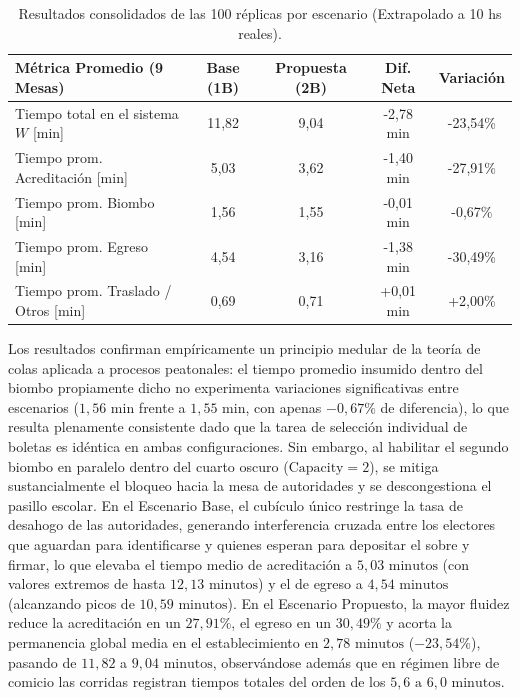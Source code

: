 \documentclass[11pt,a4paper]{article}
\begin{document}
\begin{table}[H]
    \centering
    \small
    \setlength{\tabcolsep}{5pt}
    \caption{Resultados consolidados de las 100 réplicas por escenario (Extrapolado a 10 hs reales).}
    \label{tab:metricas_corridas}
    \begin{tabularx}{\textwidth}{Xcccc}
        \toprule
        \textbf{Métrica Promedio (9 Mesas)} & \textbf{Base (1B)} & \textbf{Propuesta (2B)} & \textbf{Dif. Neta} & \textbf{Variación} \\
        \midrule
        Tiempo total en el sistema $W$ [min] & 11,82 & 9,04 & -2,78 min & -23,54\% \\
        Tiempo prom. Acreditación [min]      & 5,03  & 3,62 & -1,40 min & -27,91\% \\
        Tiempo prom. Biombo [min]            & 1,56  & 1,55 & -0,01 min & -0,67\%  \\
        Tiempo prom. Egreso [min]            & 4,54  & 3,16 & -1,38 min & -30,49\% \\
        Tiempo prom. Traslado / Otros [min]  & 0,69  & 0,71 & +0,01 min & +2,00\%  \\
        \bottomrule
    \end{tabularx}
\end{table}

Los resultados confirman empíricamente un principio medular de la teoría de colas aplicada a procesos peatonales: el tiempo promedio insumido dentro del biombo propiamente dicho no experimenta variaciones significativas entre escenarios ($1{,}56\text{ min}$ frente a $1{,}55\text{ min}$, con apenas $-0{,}67\%$ de diferencia), lo que resulta plenamente consistente dado que la tarea de selección individual de boletas es idéntica en ambas configuraciones. Sin embargo, al habilitar el segundo biombo en paralelo dentro del cuarto oscuro ($\text{Capacity} = 2$), se mitiga sustancialmente el bloqueo hacia la mesa de autoridades y se descongestiona el pasillo escolar. En el Escenario Base, el cubículo único restringe la tasa de desahogo de las autoridades, generando interferencia cruzada entre los electores que aguardan para identificarse y quienes esperan para depositar el sobre y firmar, lo que elevaba el tiempo medio de acreditación a $5{,}03\text{ minutos}$ (con valores extremos de hasta $12{,}13\text{ minutos}$) y el de egreso a $4{,}54\text{ minutos}$ (alcanzando picos de $10{,}59\text{ minutos}$). En el Escenario Propuesto, la mayor fluidez reduce la acreditación en un $27{,}91\%$, el egreso en un $30{,}49\%$ y acorta la permanencia global media en el establecimiento en $2{,}78\text{ minutos}$ ($-23{,}54\%$), pasando de $11{,}82$ a $9{,}04\text{ minutos}$, observándose además que en régimen libre de comicio las corridas registran tiempos totales del orden de los $5{,}6\text{ a }6{,}0\text{ minutos}$.
\end{document}
